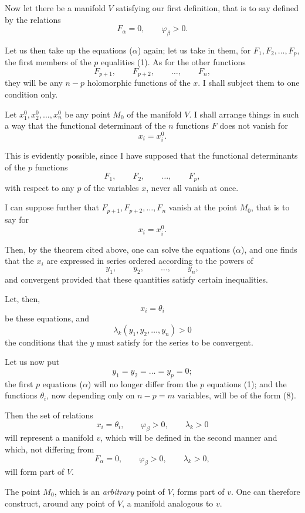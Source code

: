 \documentclass{article}
\begin{document}
Now let there be a manifold $V$ satisfying our first definition, that is to say defined by the relations
\[
F_{\alpha} = 0, \qquad \varphi_{\beta} > 0.
\tag{1}
\]

Let us then take up the equations ($\alpha$) again; let us take in them, for $F_{1}, F_{2}, \ldots, F_{p}$, the first members of the $p$ equalities (1). As for the other functions
\[
F_{p+1}, \qquad F_{p+2}, \qquad \ldots, \qquad F_{n},
\]
they will be any $n - p$ holomorphic functions of the $x$. I shall subject them to one condition only.

Let $x^{0}_{1}, x^{0}_{2}, \ldots, x^{0}_{n}$ be any point $M_{0}$ of the manifold $V$. I shall arrange things in such a way that the functional determinant of the $n$ functions $F$ does not vanish for
\[
x_{i} = x^{0}_{i}.
\]

This is evidently possible, since I have supposed that the functional determinants of the $p$ functions
\[
F_{1}, \qquad F_{2}, \qquad \ldots, \qquad F_{p},
\]
with respect to any $p$ of the variables $x$, never all vanish at once.

I can suppose further that $F_{p+1}, F_{p+2}, \ldots, F_{n}$ vanish at the point $M_{0}$, that is to say for
\[
x_{i} = x^{0}_{i}.
\]

Then, by the theorem cited above, one can solve the equations ($\alpha$), and one finds that the $x_{i}$ are expressed in series ordered according to the powers of
\[
y_{1}, \qquad y_{2}, \qquad \ldots, \qquad y_{n},
\]
and convergent provided that these quantities satisfy certain inequalities.

Let, then,
\[
x_{i} = \theta_{i}
\tag{$\beta$}
\]
be these equations, and
\[
\lambda_{k}(y_{1}, y_{2}, \ldots, y_{n}) > 0
\]
the conditions that the $y$ must satisfy for the series to be convergent.

Let us now put
\[
y_{1} = y_{2} = \ldots = y_{p} = 0;
\]
the first $p$ equations ($\alpha$) will no longer differ from the $p$ equations (1); and the functions $\theta_{i}$, now depending only on $n - p = m$ variables, will be of the form (8).

Then the set of relations
\[
x_{i} = \theta_{i}, \qquad \varphi_{\beta} > 0, \qquad \lambda_{k} > 0
\]
will represent a manifold $v$, which will be defined in the second manner and which, not differing from
\[
F_{\alpha} = 0, \qquad \varphi_{\beta} > 0, \qquad \lambda_{k} > 0,
\]
will form part of $V$.

The point $M_{0}$, which is an \emph{arbitrary} point of $V$, forms part of $v$. One can therefore construct, around any point of $V$, a manifold analogous to $v$.
\end{document}
